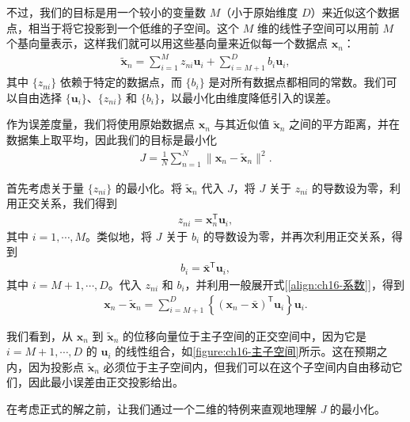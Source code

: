 \documentclass[../../main.tex]{subfiles}
\begin{document}
不过，我们的目标是用一个较小的变量数 $M$（小于原始维度 $D$）来近似这个数据点，相当于将它投影到一个低维的子空间。这个 $M$ 维的线性子空间可以用前 $M$ 个基向量表示，这样我们就可以用这些基向量来近似每一个数据点 $\bm{x}_n$：
\begin{align}
  \tilde{\bm{x}}_n=\sum_{i=1}^{M}z_{ni}\bm{u}_i+\sum_{i=M+1}^{D}b_i\bm{u}_i,
  \label{align:ch16-近似}
\end{align}
其中 $\{z_{ni}\}$ 依赖于特定的数据点，而 $\{b_i\}$ 是对所有数据点都相同的常数。我们可以自由选择 $\{\bm{u}_i\}$、$\{z_{ni}\}$ 和 $\{b_i\}$，以最小化由维度降低引入的误差。

作为误差度量，我们将使用原始数据点 $\bm{x}_n$ 与其近似值 $\tilde{\bm{x}}_n$ 之间的平方距离，并在数据集上取平均，因此我们的目标是最小化
\begin{align}
  J=\frac{1}{N}\sum_{n=1}^{N}\|\bm{x}_n-\tilde{\bm{x}}_n\|^2.
  \label{align:ch16-重建误差}
\end{align}

首先考虑关于量 $\{z_{ni}\}$ 的最小化。将 $\tilde{\bm{x}}_n$ 代入 $J$，将 $J$ 关于 $z_{ni}$ 的导数设为零，利用正交关系，我们得到
\begin{align}
  z_{ni}=\bm{x}_n^{\mathsf T}\bm{u}_i,
  \label{align:ch16-z最优}
\end{align}
其中 $i=1,\cdots,M$。类似地，将 $J$ 关于 $b_i$ 的导数设为零，并再次利用正交关系，得到
\begin{align}
  b_i=\bar{\bm{x}}^{\mathsf T}\bm{u}_i,
  \label{align:ch16-b最优}
\end{align}
其中 $i=M+1,\cdots,D$。代入 $z_{ni}$ 和 $b_i$，并利用一般展开式[\eqref{align:ch16-系数}]，得到
\begin{align}
  \bm{x}_n-\tilde{\bm{x}}_n=\sum_{i=M+1}^{D}\left\{(\bm{x}_n-\bar{\bm{x}})^{\mathsf T}\bm{u}_i\right\}\bm{u}_i.
  \label{align:ch16-残差}
\end{align}

我们看到，从 $\bm{x}_n$ 到 $\tilde{\bm{x}}_n$ 的位移向量位于主子空间的正交空间中，因为它是 $i=M+1,\cdots,D$ 的 $\bm{u}_i$ 的线性组合，如\cref{figure:ch16-主子空间}所示。这在预期之内，因为投影点 $\tilde{\bm{x}}_n$ 必须位于主子空间内，但我们可以在这个子空间内自由移动它们，因此最小误差由正交投影给出。

在考虑正式的解之前，让我们通过一个二维的特例来直观地理解 $J$ 的最小化。
\end{document}
